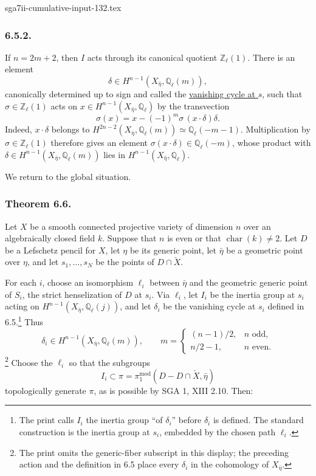 \begin{filecontents*}{sga7ii-cumulative-input-132.tex}
\subsubsection*{6.5.2.}
If $n=2m+2$, then $I$ acts through its canonical quotient
$\mathbb Z_\ell(1)$.  There is an element
\[
\delta\in H^{n-1}(X_{\bar\eta},\mathbb Q_\ell(m)),
\]
canonically determined up to sign and called the \underline{vanishing
cycle at $s$}, such that $\sigma\in\mathbb Z_\ell(1)$ acts on
$x\in H^{n-1}(X_{\bar\eta},\mathbb Q_\ell)$ by the transvection
\begin{equation}\tag{6.5.2.1}
\sigma(x)=x-(-1)^m\sigma\,(x\cdot\delta)\delta.
\end{equation}
Indeed, $x\cdot\delta$ belongs to
$H^{2n-2}(X_{\bar\eta},\mathbb Q_\ell(m))\simeq\mathbb Q_\ell(-m-1)$.
Multiplication by $\sigma\in\mathbb Z_\ell(1)$ therefore gives an
element $\sigma(x\cdot\delta)\in\mathbb Q_\ell(-m)$, whose product with
$\delta\in H^{n-1}(X_{\bar\eta},\mathbb Q_\ell(m))$ lies in
$H^{n-1}(X_{\bar\eta},\mathbb Q_\ell)$.

We return to the global situation.

\subsubsection*{Theorem 6.6.}
Let $X$ be a smooth connected projective variety of dimension $n$ over
an algebraically closed field $k$.  Suppose that $n$ is even or that
$\operatorname{char}(k)\ne2$.  Let $D$ be a Lefschetz pencil for $X$,
let $\eta$ be its generic point, let $\bar\eta$ be a geometric point
over $\eta$, and let $s_1,\ldots,s_N$ be the points of
$D\cap\check X$.

For each $i$, choose an isomorphism $\ell_i$ between $\bar\eta$ and the
geometric generic point of $S_i$, the strict henselization of $D$ at
$s_i$.  Via $\ell_i$, let $I_i$ be the inertia group at $s_i$ acting on
$H^{n-1}(X_{\bar\eta},\mathbb Q_\ell(j))$, and let $\delta_i$ be the
vanishing cycle at $s_i$ defined in 6.5.\footnote{The print calls
$I_i$ the inertia group ``of $\delta_i$'' before $\delta_i$ is defined.
The standard construction is the inertia group at $s_i$, embedded by
the chosen path $\ell_i$.}
Thus
\[
\delta_i\in H^{n-1}(X_{\bar\eta},\mathbb Q_\ell(m)),
\qquad
m=\begin{cases}
(n-1)/2,& n\text{ odd},\\
n/2-1,& n\text{ even}.
\end{cases}
\]
\footnote{The print omits the generic-fiber subscript in this display;
the preceding action and the definition in 6.5 place every
$\delta_i$ in the cohomology of $X_{\bar\eta}$.}
Choose the $\ell_i$ so that the subgroups
\[
I_i\subset
\pi=\pi_1^{\mathrm{mod}}(D-D\cap\check X,\bar\eta)
\]
topologically generate $\pi$, as is possible by SGA 1, XIII 2.10.
Then:


\end{filecontents*}
